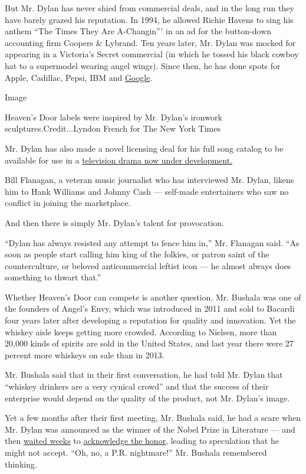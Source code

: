But Mr. Dylan has never shied from commercial deals, and in the long run
they have barely grazed his reputation. In 1994, he allowed Richie
Havens to sing his anthem ``The Times They Are A-Changin''' in an ad for
the button-down accounting firm Coopers \& Lybrand. Ten years later, Mr.
Dylan was mocked for appearing in a Victoria's Secret commercial (in
which he tossed his black cowboy hat to a supermodel wearing angel
wings). Since then, he has done spots for Apple, Cadillac, Pepsi, IBM
and
\href{https://www.ispot.tv/ad/wh74/google-assistant-make-google-do-it-feat-sia-song-by-bob-dylan}{Google}.

Image

Heaven's Door labels were inspired by Mr. Dylan's ironwork
sculptures.Credit...Lyndon French for The New York Times

Mr. Dylan has also made a novel licensing deal for his full song catalog
to be available for use in a
\href{https://www.nytimes3xbfgragh.onion/2016/04/16/business/media/bob-dylan-inspired-drama-is-in-the-works.html}{television
drama now under development.}

Bill Flanagan, a veteran music journalist who has interviewed Mr. Dylan,
likens him to Hank Williams and Johnny Cash --- self-made entertainers
who saw no conflict in joining the marketplace.

And then there is simply Mr. Dylan's talent for provocation.

``Dylan has always resisted any attempt to fence him in,'' Mr. Flanagan
said. ``As soon as people start calling him king of the folkies, or
patron saint of the counterculture, or beloved anticommercial leftist
icon --- he almost always does something to thwart that.''

Whether Heaven's Door can compete is another question. Mr. Bushala was
one of the founders of Angel's Envy, which was introduced in 2011 and
sold to Bacardi four years later after developing a reputation for
quality and innovation. Yet the whiskey aisle keeps getting more
crowded. According to Nielsen, more than 20,000 kinds of spirits are
sold in the United States, and last year there were 27 percent more
whiskeys on sale than in 2013.

Mr. Bushala said that in their first conversation, he had told Mr. Dylan
that ``whiskey drinkers are a very cynical crowd'' and that the success
of their enterprise would depend on the quality of the product, not Mr.
Dylan's image.

Yet a few months after their first meeting, Mr. Bushala said, he had a
scare when Mr. Dylan was announced as the winner of the Nobel Prize in
Literature --- and then
\href{https://www.nytimes3xbfgragh.onion/2016/10/18/business/media/dylan-newest-nobel-laureate-maintains-his-reticence.html}{waited
weeks} to
\href{https://www.nytimes3xbfgragh.onion/2016/10/29/arts/music/bob-dylan-nobel-prize-comment.html}{acknowledge
the honor}, leading to speculation that he might not accept. ``Oh, no, a
P.R. nightmare!'' Mr. Bushala remembered thinking.

